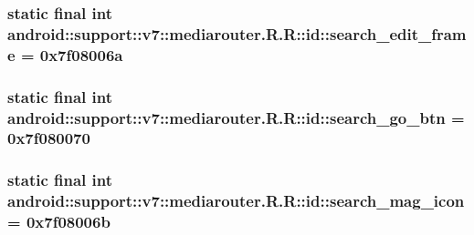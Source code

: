 \hypertarget{classandroid_1_1support_1_1v7_1_1mediarouter_1_1_r_1_1id_29474cba4809116afe18732f7523b3cd}{
\subsubsection[{search\_\-edit\_\-frame}]{\setlength{\rightskip}{0pt plus 5cm}static final int android::support::v7::mediarouter.R.R::id::search\_\-edit\_\-frame = 0x7f08006a}}
\label{classandroid_1_1support_1_1v7_1_1mediarouter_1_1_r_1_1id_29474cba4809116afe18732f7523b3cd}


\hypertarget{classandroid_1_1support_1_1v7_1_1mediarouter_1_1_r_1_1id_db10f82c5c0cb6b43ce3891f8e4723e0}{
\subsubsection[{search\_\-go\_\-btn}]{\setlength{\rightskip}{0pt plus 5cm}static final int android::support::v7::mediarouter.R.R::id::search\_\-go\_\-btn = 0x7f080070}}
\label{classandroid_1_1support_1_1v7_1_1mediarouter_1_1_r_1_1id_db10f82c5c0cb6b43ce3891f8e4723e0}


\hypertarget{classandroid_1_1support_1_1v7_1_1mediarouter_1_1_r_1_1id_bd0fddae3e66de1450d70f208d445bf2}{
\subsubsection[{search\_\-mag\_\-icon}]{\setlength{\rightskip}{0pt plus 5cm}static final int android::support::v7::mediarouter.R.R::id::search\_\-mag\_\-icon = 0x7f08006b}}
\label{classandroid_1_1support_1_1v7_1_1mediarouter_1_1_r_1_1id_bd0fddae3e66de1450d70f208d445bf2}


